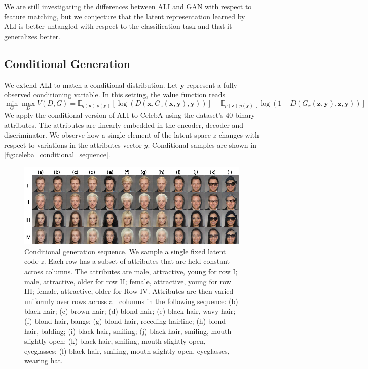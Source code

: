 \documentclass{article}
\begin{document}
We are still investigating the differences between ALI and GAN with respect to
feature matching, but we conjecture that the latent representation learned by
ALI is better untangled with respect to the classification task and that it
generalizes better.

\subsection{Conditional Generation}
We extend ALI to match a conditional distribution. Let $\bm{y}$ represent a
fully observed conditioning variable. In this setting, the value function reads
\begin{equation}
\label{eq:conditional_value_function}
\min_G \max_D V(D, G) = \mathbb{E}_{q(\bm{x})\, p(\bm{y})}[\log(D(\bm{x}, G_z(\bm{x}, \bm{y}), \bm{y}))] + \mathbb{E}_{p(\bm{z})\, p(\bm{y})}[\log(1 - D(G_x(\bm{z}, \bm{y}), \bm{z}, \bm{y}))]
\end{equation}
We apply the conditional version of ALI to CelebA using the dataset's 40 binary
attributes. The attributes are linearly embedded in the encoder, decoder and
discriminator. We observe how a single element of the latent space $z$ changes
with respect to variations in the attributes vector $y$. Conditional samples are
shown in \autoref{fig:celeba_conditional_sequence}.

\begin{figure}[htb!]
    \centering
    \includegraphics[width=\textwidth]{celeba_conditional_sequence.png}
    \caption{\label{fig:celeba_conditional_sequence} Conditional generation
    sequence. We sample a single fixed latent code $z$. Each row has a subset of
    attributes that are held constant across columns. The attributes are male,
    attractive, young for row I; male, attractive, older for row II; female,
    attractive, young for row III; female, attractive, older for Row IV.
    Attributes are then varied uniformly over rows across all columns in the
    following sequence: (b) black hair; (c) brown hair; (d) blond hair; (e)
    black hair, wavy hair; (f) blond hair, bangs; (g) blond hair, receding
    hairline; (h) blond hair, balding; (i) black hair, smiling; (j) black hair,
    smiling, mouth slightly open; (k) black hair, smiling, mouth slightly open,
    eyeglasses; (l) black hair, smiling, mouth slightly open, eyeglasses,
    wearing hat. }
\end{figure}
\end{document}
